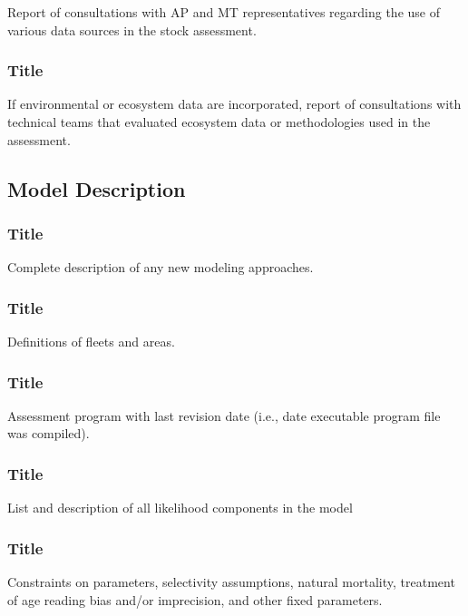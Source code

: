 \documentclass[12pt,]{article}
\begin{document}
Report of consultations with AP and MT representatives regarding the use
of various data sources in the stock assessment.

\subsubsection{Title}\label{title-5}

If environmental or ecosystem data are incorporated, report of
consultations with technical teams that evaluated ecosystem data or
methodologies used in the assessment.

\subsection{Model Description}\label{model-description}

\subsubsection{Title}\label{title-6}

Complete description of any new modeling approaches.

\subsubsection{Title}\label{title-7}

Definitions of fleets and areas.

\subsubsection{Title}\label{title-8}

Assessment program with last revision date (i.e., date executable
program file was compiled).

\subsubsection{Title}\label{title-9}

List and description of all likelihood components in the model

\subsubsection{Title}\label{title-10}

Constraints on parameters, selectivity assumptions, natural mortality,
treatment of age reading bias and/or imprecision, and other fixed
parameters.
\end{document}
